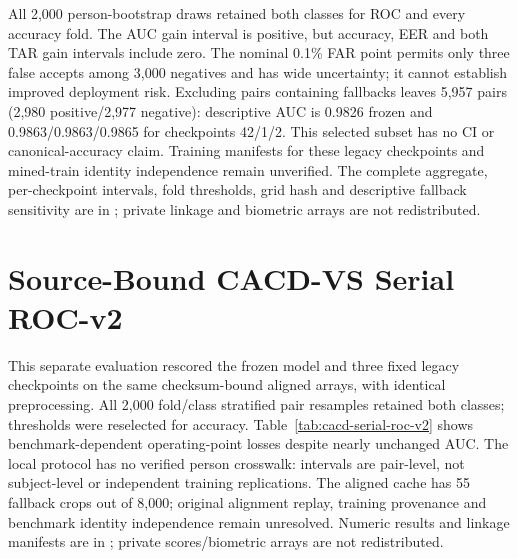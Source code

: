\documentclass[journal]{IEEEtran}
\begin{document}
All 2{,}000 person-bootstrap draws retained both classes for ROC and every accuracy fold.
The AUC gain interval is positive, but accuracy, EER and both TAR gain intervals include zero.
The nominal 0.1\% FAR point permits only three false accepts among 3{,}000 negatives and has
wide uncertainty; it cannot establish improved deployment risk. Excluding pairs containing
fallbacks leaves 5{,}957 pairs (2{,}980 positive/2{,}977 negative): descriptive AUC is 0.9826
frozen and 0.9863/0.9863/0.9865 for checkpoints 42/1/2. This selected subset has no CI or
canonical-accuracy claim. Training manifests for these legacy checkpoints and mined-train
identity independence remain unverified. The complete aggregate, per-checkpoint intervals,
fold thresholds, grid hash and descriptive fallback sensitivity are in
; private linkage and
biometric arrays are not redistributed.

\section{Source-Bound CACD-VS Serial ROC-v2}\label{sec:cacd-serial}
This separate evaluation rescored the frozen model and three fixed legacy checkpoints on
the same checksum-bound aligned arrays, with identical preprocessing. All 2{,}000 fold/class
stratified pair resamples retained both classes; thresholds were reselected for accuracy.
Table~\ref{tab:cacd-serial-roc-v2} shows benchmark-dependent operating-point losses despite
nearly unchanged AUC. The local protocol has no verified person crosswalk: intervals are
pair-level, not subject-level or independent training replications. The aligned cache has
55 fallback crops out of 8{,}000; original alignment replay, training provenance and benchmark
identity independence remain unresolved. Numeric results and linkage manifests are in
; private scores/biometric arrays are not redistributed.
\end{document}
